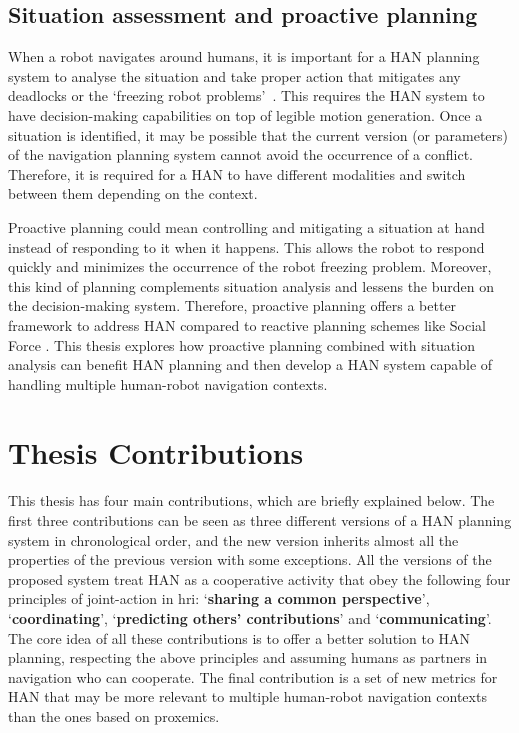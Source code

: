 \subsection*{Situation assessment and proactive planning}
When a robot navigates around humans, it is important for a HAN planning system to analyse the situation and take proper action that mitigates any deadlocks or the `freezing robot problems'~\cite{trautman2010unfreezing}. This requires the HAN system to have decision-making capabilities on top of legible motion generation. Once a situation is identified, it may be possible that the current version (or parameters) of the navigation planning system cannot avoid the occurrence of a conflict. Therefore, it is required for a HAN to have different modalities and switch between them depending on the context.

Proactive planning could mean controlling and mitigating a situation at hand instead of responding to it when it happens. This allows the robot to respond quickly and minimizes the occurrence of the robot freezing problem. Moreover, this kind of planning complements situation analysis and lessens the burden on the decision-making system. Therefore, proactive planning offers a better framework to address HAN compared to reactive planning schemes like Social Force \cite{ferrer2013social}. This thesis explores how proactive planning combined with situation analysis can benefit HAN planning and then develop a HAN system capable of handling multiple human-robot navigation contexts.

\section*{Thesis Contributions}
This thesis has four main contributions, which are briefly explained below. The first three contributions can be seen as three different versions of a HAN planning system in chronological order, and the new version inherits almost all the properties of the previous version with some exceptions. All the versions of the proposed system treat HAN as a cooperative activity that obey the following four principles of joint-action in \acrshort{hri}: `\textbf{sharing a common perspective}', `\textbf{coordinating}', `\textbf{predicting others' contributions}' and `\textbf{communicating}'. The core idea of all these contributions is to offer a better solution to HAN planning, respecting the above principles and assuming humans as partners in navigation who can cooperate. The final contribution is a set of new metrics for HAN that may be more relevant to multiple human-robot navigation contexts than the ones based on proxemics. 

